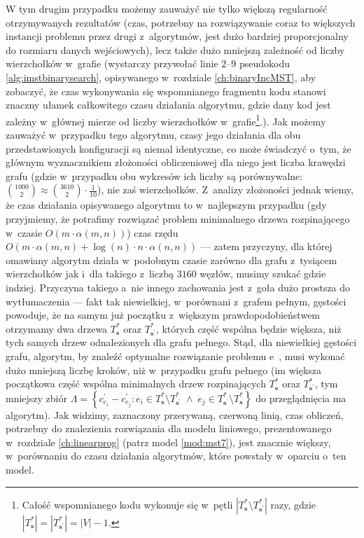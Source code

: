 W tym drugim przypadku możemy zauważyć nie tylko większą regularność otrzymywanych rezultatów (czas, potrzebny na rozwiązywanie coraz to większych instancji problemu przez drugi z~algorytmów, jest dużo bardziej proporcjonalny do rozmiaru danych wejściowych), lecz także dużo mniejszą zależność od liczby wierzchołków w~grafie (wystarczy przywołać linie $2$--$9$ pseudokodu \ref{alg:imstbinarysearch}, opisywanego w~rozdziale \ref{ch:binaryIncMST}, aby zobaczyć, że czas wykonywania się wspomnianego fragmentu kodu stanowi znaczny ułamek całkowitego czasu działania algorytmu, gdzie dany kod jest zależny w~głównej mierze od liczby wierzchołków w~grafie\footnote{Całość wspomnianego kodu wykonuje się w~pętli $\left| T^{\ast}_{\textbf{s}} \setminus T^{\ast}_{\textbf{s}^{\prime}} \right|$ razy, gdzie $\left| T^{\ast}_{\textbf{s}} \right| = \left| T^{\ast}_{\textbf{s}^{\prime}} \right| = \left| V \right| - 1$.}.). Jak możemy zauważyć w~przypadku tego algorytmu, czasy jego działania dla obu przedstawionych konfiguracji są niemal identyczne, co może świadczyć o~tym, że głównym wyznacznikiem złożoności obliczeniowej dla niego jest liczba krawędzi grafu (gdzie w~przypadku obu wykresów ich liczby są porównywalne: $\binom{1000}{2} \approx \binom{3610}{2} \cdot \frac{1}{10}$), nie zaś wierzchołków. Z~analizy złożoności jednak wiemy, że czas działania opisywanego algorytmu to w~najlepszym przypadku (gdy przyjmiemy, że potrafimy rozwiązać problem minimalnego drzewa rozpinającego w~czasie $O \left( m \cdot \alpha \left( m, n \right) \right)$) czas rzędu $O \left( m \cdot \alpha  \left( m, n \right) + \log \left( n \right) \cdot n \cdot \alpha \left( n, n \right) \right)$ --- zatem przyczyny, dla której omawiany algorytm działa w~podobnym czasie zarówno dla grafu z~tysiącem wierzchołków jak i~dla takiego z~liczbą $3160$ węzłów, musimy szukać gdzie indziej. Przyczyna takiego a~nie innego zachowania jest z~goła dużo prostsza do wytłumaczenia --- fakt tak niewielkiej, w~porównani z~grafem pełnym, gęstości powoduje, że na samym już początku z~większym prawdopodobieństwem otrzymamy dwa drzewa $T^{\ast}_{\textbf{s}}$ oraz $T^{\ast}_{\textbf{s}^{\prime}}$, których część wspólna będzie większa, niż tych samych drzew odnalezionych dla grafu pełnego. Stąd, dla niewielkiej gęstości grafu, algorytm, by znaleźć optymalne rozwiązanie problemu  e~, musi wykonać dużo mniejszą liczbę kroków, niż w~przypadku grafu pełnego (im większa początkowa część wspólna minimalnych drzew rozpinających $T^{\ast}_{\textbf{s}}$ oraz $T^{\ast}_{\textbf{s}^{\prime}}$, tym mniejszy zbiór $\Lambda = \left\{ c^{\prime}_{e_{i}} - c^{\prime}_{e_{j}} : e_{i} \in T^{\ast}_{\textbf{s}} \setminus T^{\ast}_{\textbf{s}^{\prime}} \; \wedge \; e_{j} \in T^{\ast}_{\textbf{s}^{\prime}} \setminus T^{\ast}_{\textbf{s}} \right\}$ do przeglądnięcia ma algorytm). Jak widzimy, zaznaczony przerywaną, czerwoną linią, czas obliczeń, potrzebny do znalezienia rozwiązania dla modelu liniowego, prezentowanego w~rozdziale \ref{ch:linearprog} (patrz model \ref{mod:mst7}), jest znacznie większy, w~porównaniu do czasu działania algorytmów, które powstały w~oparciu o~ten model.

